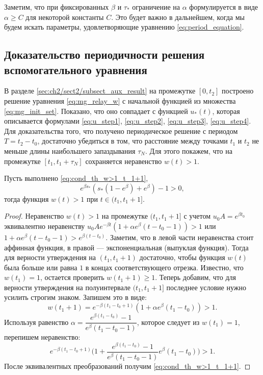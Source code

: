 Заметим, что при фиксированных $\beta$ и $\tau_*$ ограничение на $\alpha$ формулируется в виде $\alpha \geq C$ для некоторой константы $C$. Это будет важно в дальнейшем, когда мы будем искать параметры, удовлетворяющие уравнению \eqref{eq:period_equation}.


\subsection{Доказательство периодичности решения вспомогательного уравнения}
В разделе \ref{sec:ch2/sect2/subsect_aux_result} на промежутке $[0,t_2]$ построено решение уравнения \eqref{eq:mg_relay_w} с начальной функцией из множества \eqref{eq:mg_init_set}. Показано, что оно совпадает с функцией $u_*(t)$, которая описывается формулами \eqref{eq:u_step1}, \eqref{eq:u_step2}, \eqref{eq:u_step3}, \eqref{eq:u_step4}. Для доказательства того, что получено периодическое решение с периодом $T = t_2 - t_0$, достаточно убедиться в том, что расстояние между точками $t_1$ и $t_2$ не меньше длины наибольшего запаздывания $\tau_N$. Для этого покажем, что на промежутке $[t_1,t_1+\tau_N]$ сохраняется неравенство $w(t) > 1$.


\begin{proposition}
	\label{w>1_t_1-t_1+1} Пусть выполнено \eqref{eq:cond_th_w>1_t_1+1},
	\begin{equation}
		\label{w>1_t_1+1}
		e^{\beta s_*}\left(s_*(1-e^\beta) + e^\beta \right) - 1 > 0,
	\end{equation}
	тогда функция $w(t)>1$ при $t\in (t_1, t_1 + 1]$.
\end{proposition}
\begin{proof}
	Неравенство $w(t)>1$ на промежутке $(t_1, t_1 + 1]$ с учетом $u_0 A = e^{\beta t_0}$ эквивалентно неравенству $u_0Ae^{-\beta t}(1+\alpha e^{\beta }(t-t_0-1)) >1$ или $1+\alpha e^{\beta }(t-t_0-1) > e^{\beta (t-t_0)}$.
	Заметим, что в левой части неравенства стоит аффинная функция, в правой --- экспоненциальная (выпуклая функция). Тогда для верности утверждения на $(t_1, t_1 + 1)$ достаточно, чтобы функция $w(t)$ была больше или равна $1$ в концах соответствующего отрезка. Известно, что $w(t_1) = 1$, остается проверить $w(t_1+1) \geqslant 1$. Теперь добавим, что для верности утверждения на полуинтервале $(t_1, t_1 + 1]$ последнее условие нужно усилить строгим знаком.
	Запишем это в виде:
	$$w(t_1+1) = e^{-\beta (t_1 -t_0+ 1)}( 1+\alpha e^{\beta }(t_1-t_0) )>1 .$$
	Используя равенство $\alpha = \dfrac{e^{\beta(t_1 - t_0)}-1}{e^\beta(t_1 - t_0 -1)}$, которое следует из $w(t_1)=1$, перепишем неравенство:
	$$e^{-\beta(t_1-t_0+1)}\Big(1 + \dfrac{e^{\beta(t_1 - t_0)}-1}{e^\beta(t_1 - t_0 -1)}e^\beta(t_1 - t_0) \Big)>1.$$
	После эквивалентных преобразований получим \eqref{eq:cond_th_w>1_t_1+1}.
\end{proof}

